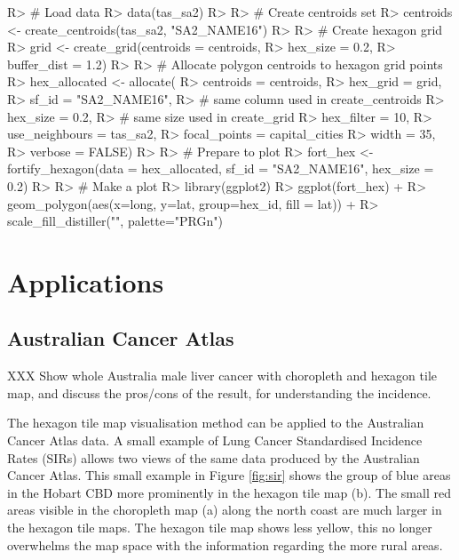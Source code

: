 \documentclass[
]{jss}
\begin{document}
\begin{CodeChunk}

\begin{CodeInput}
R> # Load data
R> data(tas_sa2)
R> 
R> # Create centroids set
R> centroids <- create_centroids(tas_sa2, "SA2_NAME16")
R> 
R> # Create hexagon grid
R> grid <- create_grid(centroids = centroids,
R>     hex_size = 0.2,
R>     buffer_dist = 1.2)
R> 
R> # Allocate polygon centroids to hexagon grid points
R> hex_allocated <- allocate(
R>   centroids = centroids,
R>   hex_grid = grid,
R>   sf_id = "SA2_NAME16",
R>   # same column used in create_centroids
R>   hex_size = 0.2,
R>   # same size used in create_grid
R>   hex_filter = 10,
R>   use_neighbours = tas_sa2,
R>   focal_points = capital_cities %
R>   width = 35,
R>   verbose = FALSE)
R> 
R> # Prepare to plot
R> fort_hex <- fortify_hexagon(data = hex_allocated, sf_id = "SA2_NAME16", hex_size = 0.2)
R> 
R> # Make a plot
R> library(ggplot2)
R> ggplot(fort_hex) + 
R>   geom_polygon(aes(x=long, y=lat, group=hex_id, fill = lat)) +
R>   scale_fill_distiller("", palette="PRGn")
\end{CodeInput}
\end{CodeChunk}

\hypertarget{applications}{%
\section{Applications}\label{applications}}

\hypertarget{australian-cancer-atlas}{%
\subsection{Australian Cancer Atlas}\label{australian-cancer-atlas}}

XXX Show whole Australia male liver cancer with choropleth and hexagon
tile map, and discuss the pros/cons of the result, for understanding the
incidence.

The hexagon tile map visualisation method can be applied to the
Australian Cancer Atlas data. A small example of Lung Cancer
Standardised Incidence Rates (SIRs) allows two views of the same data
produced by the Australian Cancer Atlas. This small example in Figure
\ref{fig:sir} shows the group of blue areas in the Hobart CBD more
prominently in the hexagon tile map (b). The small red areas visible in
the choropleth map (a) along the north coast are much larger in the
hexagon tile maps. The hexagon tile map shows less yellow, this no
longer overwhelms the map space with the information regarding the more
rural areas.
\end{document}
